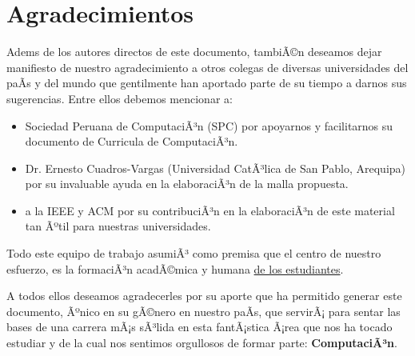 \chapter*{Agradecimientos}\label{chap:cs-ack}
%

Adem s de los autores directos de este documento, tambiÃ©n deseamos dejar manifiesto de nuestro 
agradecimiento a otros colegas de diversas universidades del paÃ­s y del mundo que gentilmente 
han aportado parte de su tiempo a darnos sus sugerencias. Entre ellos debemos mencionar a:

\begin{itemize}
\item Sociedad Peruana de ComputaciÃ³n (SPC) por apoyarnos y facilitarnos su documento de Curricula de ComputaciÃ³n.
\item Dr. Ernesto Cuadros-Vargas (Universidad CatÃ³lica de San Pablo, Arequipa) por su invaluable ayuda en la elaboraciÃ³n de la malla propuesta. 
\item a la IEEE y ACM por su contribuciÃ³n en la elaboraciÃ³n de este material tan Ãºtil para nuestras universidades.
\end{itemize}

Todo este equipo de trabajo asumiÃ³ como premisa que el centro de nuestro esfuerzo, 
es la formaciÃ³n acadÃ©mica y humana \underline{de los estudiantes}.

A todos ellos deseamos agradecerles por su aporte que ha permitido generar 
este documento, Ãºnico en su gÃ©nero en nuestro paÃ­s, que servirÃ¡ para sentar las 
bases de una carrera mÃ¡s sÃ³lida en esta fantÃ¡stica Ã¡rea que nos ha tocado estudiar y 
de la cual nos sentimos orgullosos de formar parte: \textbf{ComputaciÃ³n}.

